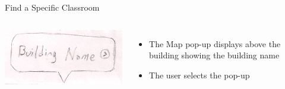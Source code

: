 \documentclass{beamer}
\begin{document}
\begin{frame}{Find a Specific Classroom}
    \begin{columns}[c]
        \center\includegraphics[width=\textwidth]{hand-drawn/map-popup.png}
        \begin{itemize}
            \item The Map pop-up displays above the building showing the building name
            \item The user selects the pop-up
        \end{itemize}
    \end{columns}
\end{frame}
\end{document}
